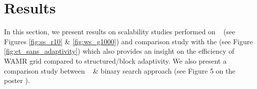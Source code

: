 \documentclass[10pt, conference]{IEEEtran} %
\begin{document}
%		
%		

%
\vspace{-0.15in}
\section{Results}
In this section, we present results on scalability studies performed on \dendrogr~ (see Figures \ref{fig:ss_r10} \& \ref{fig:ws_g1000}) and comparison study with the \ET (see Figure \ref{fig:et_sans_adaptivity}) which also provides an insight on the efficiency of WAMR grid compared to structured/block adaptivity. We also present a comparison study between \tsearch~ \& binary search approach (see Figure 5 on the poster ). 
\end{document}
